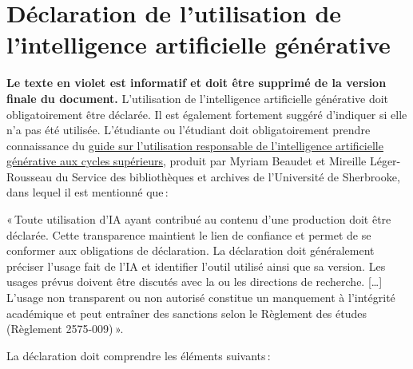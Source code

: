 \chapter*{Déclaration de l'utilisation de l'intelligence artificielle générative}

\textcolor{eclipsepurple}{\textbf{Le texte en violet est informatif et doit être supprimé de la version finale du document.} L'utilisation de l'intelligence artificielle générative doit obligatoirement être déclarée. Il est également fortement suggéré d'indiquer si elle n'a pas été utilisée. L'étudiante ou l'étudiant doit obligatoirement prendre connaissance du \href{https://libguides.biblio.usherbrooke.ca/ld.php?content_id=37838948}{guide sur l’utilisation responsable de l'intelligence artificielle générative aux cycles supérieurs}, produit par Myriam Beaudet et Mireille Léger-Rousseau du Service des bibliothèques et archives de l'Université de Sherbrooke, dans lequel il est mentionné que\,:}

\begin{customquote}
\textcolor{eclipsepurple}{%
«\,Toute utilisation d'IA ayant contribué au contenu d’une production doit être déclarée. Cette transparence maintient le lien de confiance et permet de se conformer aux obligations de déclaration. La déclaration doit généralement préciser l'usage fait de l'IA et identifier l'outil utilisé ainsi que sa version. Les usages prévus doivent être discutés avec la ou les directions de recherche. […] L'usage non transparent ou non autorisé constitue un manquement à l'intégrité académique et peut entraîner des sanctions selon le Règlement des études (Règlement 2575-009)\,».%
}
\end{customquote}

\textcolor{eclipsepurple}{La déclaration doit comprendre les éléments suivants\,:} 

